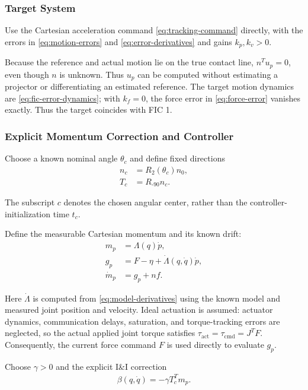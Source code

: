 \documentclass[10pt,journal,letterpaper]{IEEEtran}
\begin{document}
\subsubsection{Target System}

Use the Cartesian acceleration command \eqref{eq:tracking-command} directly, with the errors in \eqref{eq:motion-errors} and \eqref{eq:error-derivatives} and gains $k_p,k_v>0$.

Because the reference and actual motion lie on the true contact line, $n^Tu_p=0$, even though $n$ is unknown. Thus $u_p$ can be computed without estimating a projector or differentiating an estimated reference. The target motion dynamics are \eqref{eq:fic-error-dynamics}; with $k_f=0$, the force error in \eqref{eq:force-error} vanishes exactly. Thus the target coincides with FIC 1.

\subsubsection{Explicit Momentum Correction and Controller}

Choose a known nominal angle $\theta_c$ and define fixed directions
\begin{align*}
n_c&=R_2(\theta_c)n_0,\\
T_c&=R_{\text{-90}}n_c.
\end{align*}

The subscript $c$ denotes the chosen angular center, rather than the controller-initialization time $t_c$.

Define the measurable Cartesian momentum and its known drift:
\begin{equation}\label{eq:momentum-model}
\begin{aligned}
m_p&=\Lambda(q)\dot p,\\
g_p&=F-\eta+\dot\Lambda(q,\dot q)\dot p,\\
\dot m_p&=g_p+nf.
\end{aligned}
\end{equation}

Here $\dot\Lambda$ is computed from \eqref{eq:model-derivatives} using the known model and measured joint position and velocity. Ideal actuation is assumed: actuator dynamics, communication delays, saturation, and torque-tracking errors are neglected, so the actual applied joint torque satisfies $\tau_{\mathrm{act}}=\tau_{\mathrm{cmd}}=J^TF$. Consequently, the current force command $F$ is used directly to evaluate $g_p$.

Choose $\gamma>0$ and the explicit I\&I correction
\begin{equation}\label{eq:momentum-correction}
\begin{aligned}
\beta(q,\dot q)=-\gamma T_c^Tm_p.
\end{aligned}
\end{equation}
\end{document}
